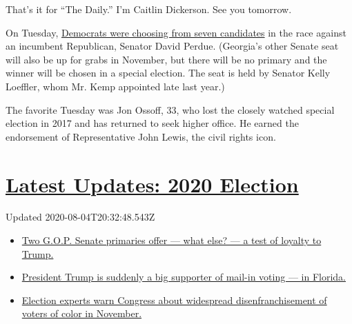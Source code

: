 That's it for ``The Daily.'' I'm Caitlin Dickerson. See you tomorrow.

On Tuesday,
\href{https://www.nytimes.com/2020/06/09/us/politics/primary-election-day-voting-atlanta.html}{Democrats
were choosing from seven candidates} in the race against an incumbent
Republican, Senator David Perdue. (Georgia's other Senate seat will also
be up for grabs in November, but there will be no primary and the winner
will be chosen in a special election. The seat is held by Senator Kelly
Loeffler, whom Mr. Kemp appointed late last year.)

The favorite Tuesday was Jon Ossoff, 33, who lost the closely watched
special election in 2017 and has returned to seek higher office. He
earned the endorsement of Representative John Lewis, the civil rights
icon.

\hypertarget{latest-updates-2020-election}{%
\section{\texorpdfstring{\href{https://www.nytimes.com/2020/08/04/us/elections/primary-election-michigan-arizona-kansas.html?action=click\&pgtype=Article\&state=default\&region=MAIN_CONTENT_1\&context=storylines_live_updates}{Latest
Updates: 2020
Election}}{Latest Updates: 2020 Election}}\label{latest-updates-2020-election}}

Updated 2020-08-04T20:32:48.543Z

\begin{itemize}
\tightlist
\item
  \href{https://www.nytimes.com/2020/08/04/us/elections/primary-election-michigan-arizona-kansas.html?action=click\&pgtype=Article\&state=default\&region=MAIN_CONTENT_1\&context=storylines_live_updates\#link-3924dd44}{Two
  G.O.P. Senate primaries offer --- what else? --- a test of loyalty to
  Trump.}
\item
  \href{https://www.nytimes.com/2020/08/04/us/elections/primary-election-michigan-arizona-kansas.html?action=click\&pgtype=Article\&state=default\&region=MAIN_CONTENT_1\&context=storylines_live_updates\#link-32b39e33}{President
  Trump is suddenly a big supporter of mail-in voting --- in Florida.}
\item
  \href{https://www.nytimes.com/2020/08/04/us/elections/primary-election-michigan-arizona-kansas.html?action=click\&pgtype=Article\&state=default\&region=MAIN_CONTENT_1\&context=storylines_live_updates\#link-6d019753}{Election
  experts warn Congress about widespread disenfranchisement of voters of
  color in November.}
\end{itemize}

